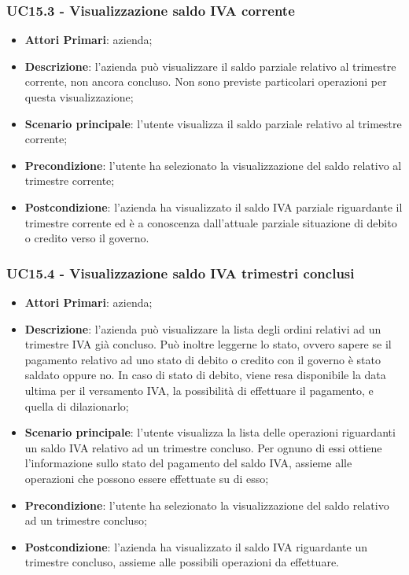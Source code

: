 \subsubsection{UC15.3 - Visualizzazione saldo IVA corrente}
\begin{itemize}
	\item \textbf{Attori Primari}: azienda;
	\item \textbf{Descrizione}: l'azienda può visualizzare il saldo parziale relativo al trimestre corrente, non ancora concluso. Non sono previste particolari operazioni per questa visualizzazione;
	\item \textbf{Scenario principale}: l'utente visualizza il saldo parziale relativo al trimestre corrente;
	\item \textbf{Precondizione}: l'utente ha selezionato la visualizzazione del saldo relativo al trimestre corrente;
	\item \textbf{Postcondizione}: l'azienda ha visualizzato il saldo IVA parziale riguardante il trimestre corrente ed è a conoscenza dall'attuale parziale situazione di debito o credito verso il governo.
\end{itemize} 

\subsubsection{UC15.4 - Visualizzazione saldo IVA trimestri conclusi}
\begin{itemize}
	\item \textbf{Attori Primari}: azienda;
	\item \textbf{Descrizione}: l'azienda può visualizzare la lista degli ordini relativi ad un trimestre IVA già concluso. Può inoltre leggerne lo stato, ovvero sapere se il pagamento relativo ad uno stato di debito o credito con il governo è stato saldato oppure no. In caso di stato di debito, viene resa disponibile la data ultima per il versamento IVA, la possibilità di effettuare il pagamento, e quella di dilazionarlo;
	\item \textbf{Scenario principale}: l'utente visualizza la lista delle operazioni riguardanti  un saldo IVA relativo ad un trimestre concluso. Per ognuno di essi ottiene l'informazione sullo stato del pagamento del saldo IVA, assieme alle operazioni che possono essere effettuate su di esso;
	\item \textbf{Precondizione}: l'utente ha selezionato la visualizzazione del saldo relativo ad un trimestre concluso;
	\item \textbf{Postcondizione}: l'azienda ha visualizzato il saldo IVA riguardante un trimestre concluso, assieme alle possibili operazioni da effettuare.
\end{itemize} 

